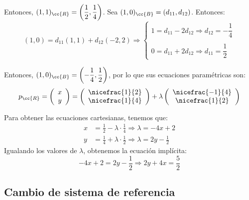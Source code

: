 \begin{ejemplo}
    Entonces, $(1,1)_{\cc{R}}=\left(\dfrac{1}{2},\dfrac{1}{4}\right)$. Sea $(1,0)_{\cc{B}}=(d_{11},d_{12})$. Entonces:
    \begin{equation*}
        (1,0)=d_{11}(1,1) + d_{12}(-2,2) \Longrightarrow
        \left\{
        \begin{array}{l}
            1 = d_{11}-2d_{12}\Longrightarrow d_{12}=-\dfrac{1}{4}\\ \\
            0 = d_{11} +2d_{12} \Longrightarrow d_{11}=\dfrac{1}{2}
        \end{array}
        \right.
    \end{equation*}

    Entonces, $(1,0)_{\cc{B}}=\left(-\dfrac{1}{4},\dfrac{1}{2}\right)$, por lo que sus ecuaciones paramétricas son:
    \begin{equation*}
        p_{\cc{R}}=
        \left(\begin{array}{c}
            x \\ y
        \end{array}\right)
        = \left(\begin{array}{c}
            \nicefrac{1}{2} \\ \nicefrac{1}{4}
        \end{array}\right)
        +\lambda \left(\begin{array}{c}
            \nicefrac{-1}{4} \\ \nicefrac{1}{2}
        \end{array}\right)
    \end{equation*}

    Para obtener las ecuaciones cartesianas, tenemos que:
    \begin{equation*}
        \begin{split}
            x&= \frac{1}{2} -\lambda\cdot \frac{1}{4} \Longrightarrow \lambda = -4x+2\\
            y&= \frac{1}{4} + \lambda\cdot \frac{1}{2} \Longrightarrow \lambda =2y - \frac{1}{2}
        \end{split}
    \end{equation*}
    Igualando los valores de $\lambda$, obtenemos la ecuación implícita:
    \begin{equation*}
        -4x+2 = 2y - \frac{1}{2} \Longrightarrow 2y + 4x = \frac{5}{2}
    \end{equation*}
\end{ejemplo}


\subsection{Cambio de sistema de referencia}

